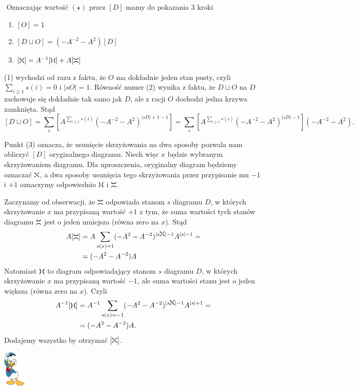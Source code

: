 \documentclass{article}
\renewenvironment{proof}{{\bfseries\color{orange} Dowód}$ $\newline}{
  \begin{flushright}\includegraphics[width=30pt]{Donald_Duck.png}\end{flushright}$ $\newline
}
\begin{document}
\begin{proof}
  Oznaczając wartość $(\star)$ przez $[D]$ mamy do pokazania $3$ kroki
  \begin{enumerate}
    \item $[O]=1$
    \item $[D\sqcup O]=(-A^{-2}-A^2)[D]$
    \item $[\iksik]=A^{-1}[\lewoprawo]+A[\goradol]$
  \end{enumerate}

  (1) wychodzi od razu z faktu, że $O$ ma dokładnie jeden stan pusty, czyli $\sum_{i\geq 1}s(i)=0$ i $|sO|=1$. Równość numer (2) wynika z faktu, że $D\sqcup O$ na $D$ zachowuje się dokładnie tak samo jak $D$, ale z racji $O$ dochodzi jedna krzywa zamknięta. Stąd 
  $$[D\sqcup O]=\sum_s\left[A^{\sum_{i\geq 1}s(i)}(-A^{-2}-A^2)^{|sD|+1-1}\right]=\sum_s\left[A^{\sum_{i\geq 1}s(i)}(-A^{-2}-A^2)^{|sD|-1}\right](-A^{-2}-A^2).$$

  Punkt (3) oznacza, że usunięcie skrzyżowania na dwa sposoby pozwala nam obliczyć $[D]$ oryginalnego diagramu. Niech więc $x$ będzie wybranym skrzyżowaniem diagramu. Dla uproszczenia, oryginalny diagram będziemy oznaczać $\iksik$, a dwa sposoby usunięcia tego skrzyżowania przez przypisanie mu $-1$ i $+1$ oznaczymy odpowiednio $\lewoprawo$ i $\goradol$.
%

  Zaczynamy od obserwacji, że $\goradol$ odpowiada stanom $s$ diagramu $D$, w których skrzyżowanie $x$ ma przypisaną wartość $+1$ z tym, że suma wartości tych stanów diagramu $\goradol$ jest o jeden mniejsza (równa zero na $x$). Stąd
  \begin{align*}
    A[\goradol] &= A\sum_{s(x)=1}(-A^2-A^{-2})^{|s\iksik|-1}A^{|s|-1}=\\ 
                &=(-A^2-A^{-2})A
  \end{align*}
  Natomiast $\lewoprawo$ to diagram odpowiadający stanom $s$ diagramu $D$, w których skrzyżowanie $x$ ma przypisaną wartość $-1$, ale suma wartości stanu jest o jeden większa (równa zero na $x$). Czyli
  \begin{align*}
    A^{-1}[\lewoprawo]&=A^{-1}\sum_{s(x)=-1}(-A^2-A^{-2})^{|s\iksik|-1}A^{|s|+1}=\\ 
                      &=(-A^2-A^{-2})A.
  \end{align*}
  Dodajemy wszystko by otrzymać $[\iksik]$.
\end{proof}
\end{document}
